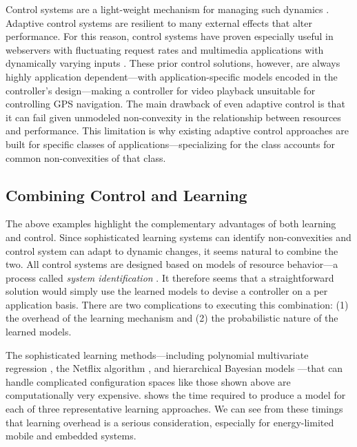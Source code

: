 Control systems are a light-weight mechanism for managing such
dynamics \cite{Hellerstein2004a}. Adaptive control systems are
resilient to many external effects that alter performance.  For this
reason, control systems have proven especially useful in webservers
with fluctuating request rates
\cite{Horvarth,LuEtAl-2006a,SunDaiPan-2008a} and multimedia
applications with dynamically varying inputs
\cite{TCST,Agilos,grace2}.  These prior control solutions, however,
are always highly application dependent---with application-specific
models encoded in the controller's design---making a controller for
video playback unsuitable for controlling GPS navigation.  The main
drawback of even adaptive control is that it can fail given unmodeled
non-convexity in the relationship between resources and performance.
This limitation is why existing adaptive control approaches are built
for specific classes of applications---specializing for the class
accounts for common non-convexities of that class.

\subsection{Combining Control and Learning}
The above examples highlight the complementary advantages of both
learning and control.  Since sophisticated learning systems can
identify non-convexities and control system can adapt to dynamic
changes, it seems natural to combine the two.  All control systems are
designed based on models of resource behavior---a process called
\emph{system identification} \cite{ControlHandbook}.  It therefore
seems that a straightforward solution would simply use the learned
models to devise a controller on a per application basis.
There are two complications to executing this combination: (1) the
overhead of the learning mechanism and (2) the probabilistic nature of
the learned models.  

The sophisticated learning methods---including polynomial multivariate
regression \cite{}, the Netflix algorithm \cite{}, and hierarchical
Bayesian models \cite{}---that can handle complicated configuration
spaces like those shown above are computationally very expensive.
\tblref{} shows the time required to produce a model for each of three
representative learning approaches.  We can see from these timings
that learning overhead is a serious consideration, especially for
energy-limited mobile and embedded systems. 

